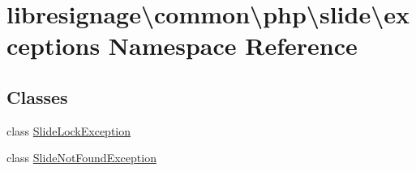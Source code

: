 \hypertarget{namespacelibresignage_1_1common_1_1php_1_1slide_1_1exceptions}{}\section{libresignage\textbackslash{}common\textbackslash{}php\textbackslash{}slide\textbackslash{}exceptions Namespace Reference}
\label{namespacelibresignage_1_1common_1_1php_1_1slide_1_1exceptions}
\subsection*{Classes}
\begin{DoxyCompactItemize}
\item 
class \hyperlink{classlibresignage_1_1common_1_1php_1_1slide_1_1exceptions_1_1SlideLockException}{Slide\+Lock\+Exception}
\item 
class \hyperlink{classlibresignage_1_1common_1_1php_1_1slide_1_1exceptions_1_1SlideNotFoundException}{Slide\+Not\+Found\+Exception}
\end{DoxyCompactItemize}
